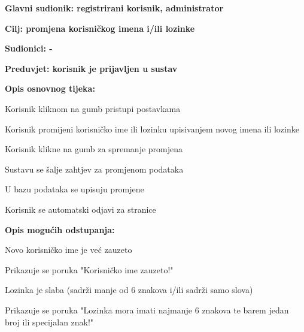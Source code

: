 				
					\noindent {}
					\begin{packed_item}
						\item \textbf{Glavni sudionik: registrirani korisnik, administrator}
						\item  \textbf{Cilj: promjena korisničkog imena i/ili lozinke}
						\item  \textbf{Sudionici: -}
						\item  \textbf{Preduvjet: korisnik je prijavljen u sustav}
						
						\item  \textbf{Opis osnovnog tijeka:}
						\item[] \begin{packed_enum}
							\item Korisnik kliknom na gumb pristupi postavkama
							\item Korisnik promijeni korisničko ime ili lozinku upisivanjem novog imena ili lozinke
							\item Korisnik klikne na gumb za spremanje promjena
							\item Sustavu se šalje zahtjev za promjenom podataka 
							\item U bazu podataka se upisuju promjene
							\item Korisnik se automatski odjavi za stranice
						\end{packed_enum}
						
						\item  \textbf{Opis mogućih odstupanja:}
						\item[] \begin{packed_item}
							\item[5.a] Novo korisničko ime je već zauzeto
							\begin{packed_enum}
								\item Prikazuje se poruka "Korisničko ime zauzeto!"
							\end{packed_enum}
							\item[5.b] Lozinka je slaba (sadrži manje od 6 znakova i/ili sadrži samo slova)
							\begin{packed_enum}
								\item Prikazuje se poruka "Lozinka mora imati najmanje 6 znakova te barem jedan broj ili specijalan znak!"
							\end{packed_enum}
						\end{packed_item}
					\end{packed_item}
				
